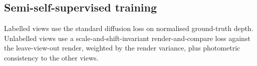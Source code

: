 \subsection{Semi-self-supervised training}
\label{sec:training}
Labelled views use the standard diffusion loss on normalised ground-truth depth. Unlabelled views use a scale-and-shift-invariant
render-and-compare loss against the leave-view-out render, weighted by the render variance, plus photometric consistency to the other views.
